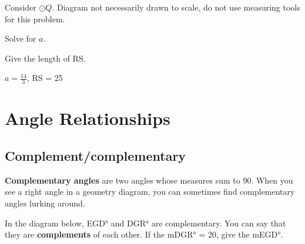 \begin{exercises}
	\begin{ex} Consider $\odot Q$.  Diagram not necessarily drawn to scale, do not use measuring tools for this problem.

\begin{exparts}
\item Solve for $a$.

\begin{flushright}
\end{flushright}

\item Give the length of \seg RS.
\end{exparts}

\begin{sol}
$a=\frac{14}{3}$, \seg RS = 25
\end{sol}
\end{ex}
\smallskip	
	
\end{exercises}

\section{Angle Relationships}
\subsection{Complement/complementary}
\textbf{Complementary angles} are two angles whose measures sum to 90\degree.  When you see a right angle in a geometry diagram, you can sometimes find complementary angles lurking around.

In the diagram below, \ang{EGD} and \ang{DGR} are complementary. 
You can say that they are \textbf{complements} of each other.
\q If the m\ang{DGR} = 20\degree, give the m\ang{EGD}.

	\begin{center}
	\end{center}
	
